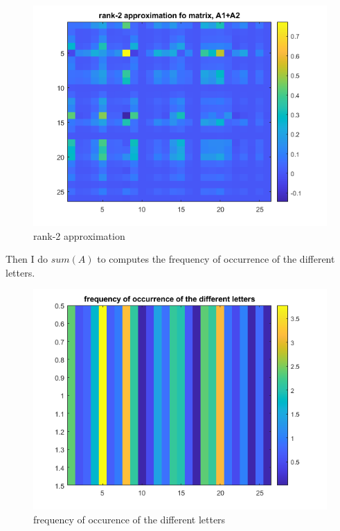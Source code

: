 \documentclass[a4paper]{article}
\begin{document}
\begin{figure}[H] 
\centering 
\includegraphics[width=1.0\textwidth]{2.1-4.png}
\caption{rank-2 approximation} 
\label{Fig.Fig.2.1-4} 
\end{figure}

Then I do $sum(A)$ to computes the frequency of occurrence of the different letters.

\begin{figure}[H] 
\centering 
\includegraphics[width=1.0\textwidth]{2.1-5.png}
\caption{frequency of occurence of the different letters} 
\label{Fig.Fig.2.1-5} 
\end{figure}
\end{document}
